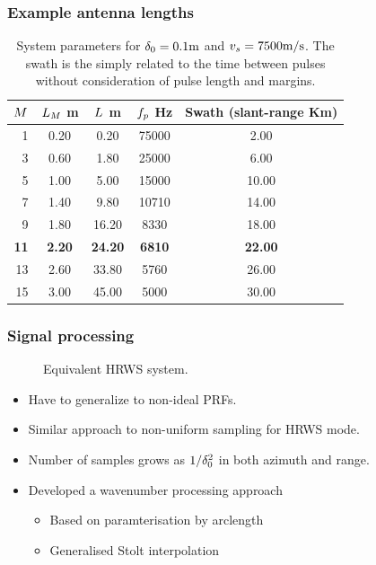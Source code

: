 \documentclass{beamer}
\begin{document}
%
\begin{frame}
\frametitle{Example antenna lengths}
\begin{table}[h!]
\begin{center}
\caption{System parameters for $\delta_0=0.1 \text{m}$ and $v_s=7500 \text{m/s}$. The swath is the simply related to the time between pulses without consideration of pulse length and margins.}
\label{tb:Simulation}
 \begin{tabular}{r|c|c|c|c}\\\hline
  {\bf $M$} & {\bf $L_M$ m} & {\bf $L$ m} & {\bf $f_p$ Hz} & {\bf Swath (slant-range Km)}\\\hline 
1 & 0.20 & 0.20 & 75000 & 2.00\\\hline
3 & 0.60 & 1.80 & 25000 & 6.00\\\hline
5 & 1.00 & 5.00 & 15000 & 10.00\\\hline
7 & 1.40 & 9.80 & 10710 & 14.00\\\hline
9 & 1.80 & 16.20 & 8330 & 18.00\\\hline
{\bf 11} & {\bf 2.20} & {\bf 24.20} & {\bf 6810} & {\bf 22.00}\\\hline
13 & 2.60 & 33.80 & 5760 & 26.00\\\hline
15 & 3.00 & 45.00 & 5000 & 30.00\\\hline
 \end{tabular}
 \end{center}
\end{table}
\end{frame}
%
\begin{frame}
\frametitle{Signal processing}
\begin{figure}[h!]
\begin{center}
 \resizebox{0.9\textwidth}{!}{}
 \caption{Equivalent HRWS system.}
 \label{fg:equivHRWS}
 \end{center}
\end{figure}
\begin{itemize}
\item Have to generalize to non-ideal PRFs.
\item Similar approach to non-uniform sampling for HRWS mode.
\item Number of samples grows as $1/\delta_0^2$ in both azimuth and range.
\item Developed a wavenumber processing approach
\begin{itemize}
\item Based on paramterisation by arclength
\item Generalised Stolt interpolation
\end{itemize}
\end{itemize}
\end{frame}
\end{document}
